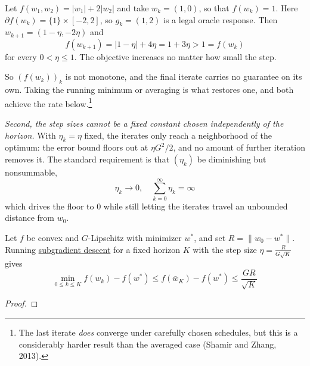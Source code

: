 	\begin{example}[Subgradients of $|w_1| + 2|w_2|$]
	  \label{ex:subgradients-of-x12x2}
		Let $f(w_1, w_2) = |w_1| + 2|w_2|$ and take $w_k = (1, 0)$, so that $f(w_k) = 1$. Here $\partial f(w_k) = \{1\} \times [-2, 2]$, so $g_k = (1, 2)$ is a legal oracle response. Then $w_{k+1} = (1 - \eta, -2\eta)$ and
		\begin{equation}
			f(w_{k+1}) = |1 - \eta| + 4\eta = 1 + 3\eta > 1 = f(w_k)
		\end{equation}
		for every $0 < \eta \leq 1$. The objective increases no matter how small the step.
	\end{example}

	So $(f(w_k))_k$ is not monotone, and the final iterate carries no guarantee on its own. Taking the running minimum or averaging is what restores one, and both achieve the rate below.\footnote{The last iterate \textit{does} converge under carefully chosen schedules, but this is a considerably harder result than the averaged case (Shamir and Zhang, 2013).}

	\textit{Second, the step sizes cannot be a fixed constant chosen independently of the horizon.} With $\eta_k = \eta$ fixed, the iterates only reach a neighborhood of the optimum: the error bound floors out at $\eta G^2 / 2$, and no amount of further iteration removes it. The standard requirement is that $(\eta_k)$ be diminishing but nonsummable,
	\begin{equation}
		\eta_k \to 0, \quad \sum_{k=0}^\infty \eta_k = \infty
	\end{equation}
	which drives the floor to $0$ while still letting the iterates travel an unbounded distance from $w_0$.

	\begin{theorem}
	  \label{thm:convergence-of-subgradient-descent}
		Let $f$ be convex and $G$-Lipschitz with minimizer $w^\ast$, and set $R = \|w_0 - w^\ast\|$. Running \hyperref[def:subgradient_descent]{subgradient descent} for a fixed horizon $K$ with the step size $\eta = \frac{R}{G \sqrt{K}}$ gives
		\begin{equation}
			\min_{0 \leq k \leq K} f(w_k) - f(w^\ast) \leq f(\bar{w}_K) - f(w^\ast) \leq \frac{GR}{\sqrt{K}}
		\end{equation}
	\end{theorem}
	\begin{proof}

	\end{proof}


